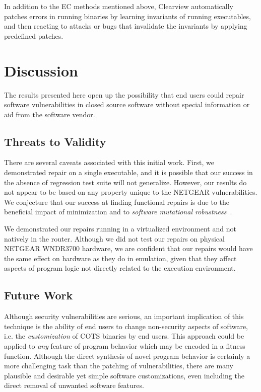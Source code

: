 \documentclass{sig-alternate}
\begin{document}
In addition to the EC methods mentioned above, Clearview
\cite{clearview} automatically patches errors in running binaries by
learning invariants of running executables, and then reacting to
attacks or bugs that invalidate the invariants by applying predefined
patches.

\section{Discussion}
\label{sec:discussion}

The results presented here open up the possibility that end users
could repair software vulnerabilities in closed source software
without special information or aid from the software vendor.

\subsection{Threats to Validity}

There are several caveats associated with this initial work.  First,
we demonstrated repair on a single executable, and it is possible that
our success in the absence of regression test suite will not
generalize.  However, our results do not appear to be based on any
property unique to the NETGEAR vulnerabilities.  We conjecture that
our success at finding functional repairs is due to
the beneficial impact of minimization and to \emph{software mutational
  robustness}~\cite{schulte2013software,schulte2014dissertation}.

We demonstrated our repairs running in a virtualized environment and
not natively in the router.  Although we did not test our repairs on
physical NETGEAR WNDR3700 hardware, we are confident that our repairs
would have the same effect on hardware as they do in emulation, given
that they affect aspects of program logic not directly related to the
execution environment.

\subsection{Future Work}

Although security vulnerabilities are serious, an important
implication of this technique is the ability of end users to change
non-security aspects of software, i.e. the {\em customization} of COTS
binaries by end users.  This approach could be applied to {\em any}
feature of program behavior which may be encoded in a fitness
function.  Although the direct synthesis of novel program behavior is
certainly a more challenging task than the patching of
vulnerabilities, there are many plausible and desirable yet simple
software customizations, even including the direct removal of unwanted
software features.
\end{document}

